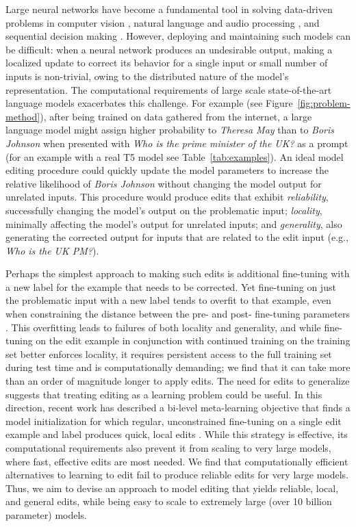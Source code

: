 \documentclass{article}
\begin{document}
Large neural networks have become a fundamental tool in solving data-driven problems in computer vision \citep{huang2017densely}, natural language and audio processing \citep{vaswani2017attention}, and sequential decision making \citep{wu2021greedy}. However, deploying and maintaining such models can be difficult: when a neural network produces an undesirable output, making a localized update to correct its behavior for a single input or small number of inputs is non-trivial, owing to the distributed nature of the model's representation. The computational requirements of large scale state-of-the-art language models exacerbates this challenge. For example (see Figure~\ref{fig:problem-method}), after being trained on data gathered from the internet, a large language model might assign higher probability to \textit{Theresa May} than to \textit{Boris Johnson} when presented with \textit{Who is the prime minister of the UK?} as a prompt (for an example with a real T5 model \citep{2020t5} see Table~\ref{tab:examples}). An ideal model editing procedure could quickly update the model parameters to increase the relative likelihood of \textit{Boris Johnson} without changing the model output for unrelated inputs. This procedure would produce edits that exhibit \textit{reliability}, successfully changing the model's output on the problematic input; \textit{locality}, minimally affecting the model's output for unrelated inputs; and \textit{generality}, also generating the corrected output for inputs that are related to the edit input (e.g., \textit{Who is the UK PM?}).

Perhaps the simplest approach to making such edits is additional fine-tuning with a new label for the example that needs to be corrected. Yet fine-tuning on just the problematic input with a new label tends to overfit to that example, even when constraining the distance between the pre- and post- fine-tuning parameters \citep{zhu2020modifying,Cao2021EditingFK}. This overfitting leads to failures of both locality and generality, and while fine-tuning on the edit example in conjunction with continued training on the training set better enforces locality, it requires persistent access to the full training set during test time and is computationally demanding; we find that it can take more than an order of magnitude longer to apply edits. The need for edits to generalize suggests that treating editing as a learning problem could be useful.
In this direction, recent work has described a bi-level meta-learning objective that finds a model initialization for which regular, unconstrained fine-tuning on a single edit example and label produces quick, local edits \citep{Sinitsin2020Editable}. While this strategy is effective, its computational requirements also prevent it from scaling to very large models, where fast, effective edits are most needed. We find that computationally efficient alternatives to learning to edit \citep{Cao2021EditingFK} fail to produce reliable edits for very large models. Thus, we aim to devise an approach to model editing that yields reliable, local, and general edits, while being easy to scale to extremely large (over 10 billion parameter) models.
\end{document}
